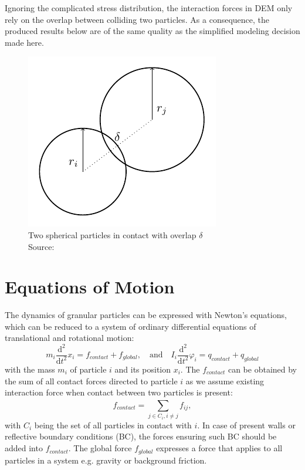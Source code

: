 \documentclass[11pt,
               a4paper,
               bibtotoc,
               idxtotoc,
               headsepline,
               footsepline,
               footexclude,
               BCOR12mm,
               DIV13,
               openany,   %
               ]
               {scrbook}
\begin{document}
Ignoring the complicated stress distribution, the interaction forces in DEM only rely on the overlap between colliding two particles. As a consequence, the produced results below are of the same quality as the simplified modeling decision made here. 

 \begin{figure}[H] %
	\centering
	\includegraphics[width=.3\columnwidth]{figures/discrete_spherical_particle_model.pdf}
	\caption[Example Figure]{Two spherical particles in contact with overlap $\delta$ \\
		\tiny{Source: \cite{Luding2008}}}
	\label{fig:discrete_spherical_particle_model} %
\end{figure}

\chapter{Equations of Motion}
The dynamics of granular particles can be expressed with Newton's equations, which can be reduced to a system of ordinary differential equations of translational and rotational  motion:
\begin{equation}
	m_i \frac{\mathrm{d}^2}{\mathrm{d}t^2} x_i = f_{contact} + f_{global}, \quad \text{and} \quad
	I_i \frac{\mathrm{d}^2}{\mathrm{d}t^2} \varphi_i = q_{contact} + q_{global}
\end{equation}
with the mass $m_i$  of particle $i$ and its position $x_i$. The $f_{contact}$ can be obtained by the sum of all contact forces directed to particle $i$ as we assume existing interaction force when contact between two particles is present:
\begin{equation}
f_{contact} = \sum_{j \in C_{i}, i \neq j}^{} f_{ij},
\end{equation}
with $C_i$ being the set of all particles in contact with $i$. In case of present walls or reflective boundary conditions (BC), the forces ensuring such BC should be added into $f_{contact}$.
The global force $f_{global}$ expresses a force that applies to all particles in a system e.g. gravity or background friction.
\end{document}
